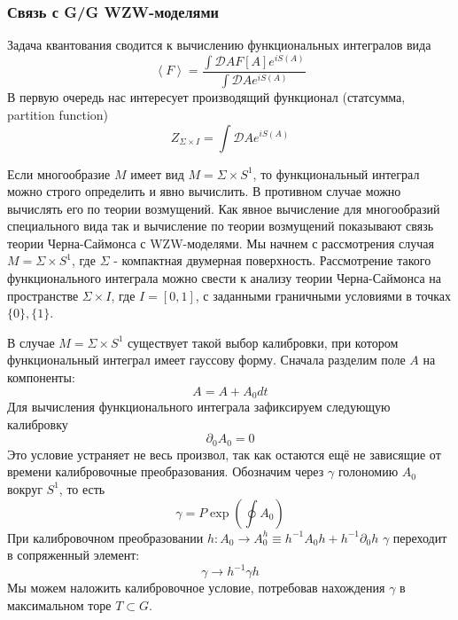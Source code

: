 \documentclass[a4paper,12pt]{article}
\theoremstyle{definition} \newtheorem{Def}{Definition}
\begin{document}
\subsubsection{Связь с G/G WZW-моделями}
\label{sec:gg-wzw}

Задача квантования сводится к вычислению функциональных интегралов вида
\begin{equation}
  \label{eq:9}
  \left< F \right> = \frac{\int \mathcal{D} A F[A] e^{i S(A)}}{\int \mathcal{D} A e^{iS(A)}}
\end{equation}
В первую очередь нас интересует производящий функционал (статсумма, partition function)
\begin{equation}
  \label{eq:14}
  Z_{\Sigma\times I}=\int \mathcal{D} A e^{iS(A)}
\end{equation}

Если многообразие $M$ имеет вид $M=\Sigma\times S^1$, то функциональный интеграл можно строго определить и явно вычислить. В противном случае можно вычислять его по теории возмущений. Как явное вычисление для многообразий специального вида так и вычисление по теории возмущений показывают связь теории Черна-Саймонса с WZW-моделями. Мы начнем с рассмотрения случая $M=\Sigma\times S^1$, где $\Sigma$ - компактная двумерная поверхность. Рассмотрение такого функционального интеграла можно свести к анализу теории Черна-Саймонса на пространстве $\Sigma\times I$, где $I=[0,1]$, с заданными граничными условиями в точках $\{0\}, \{1\}$.

В случае $M=\Sigma\times S^1$ существует такой выбор калибровки, при котором функциональный интеграл имеет гауссову форму.
Сначала разделим поле $A$ на компоненты:
\begin{equation}
  \label{eq:105}
  A=A+A_0 dt
\end{equation}
Для вычисления функционального интеграла зафиксируем следующую калибровку
\begin{equation}
  \label{eq:11}
  \partial_0 A_0 =0
\end{equation}
Это условие устраняет не весь произвол, так как остаются ещё не зависящие от времени калибровочные преобразования. Обозначим через $\gamma$ голономию $A_0$ вокруг $S^1$, то есть
\begin{equation}
  \label{eq:12}
  \gamma=P \exp\left(\oint A_0\right)
\end{equation}
При калибровочном преобразовании $h: A_0\to A_0^h\equiv h^{-1} A_0 h+h^{-1}\partial_0 h$ $\gamma$ переходит в сопряженный элемент:
\begin{equation}
  \label{eq:99}
  \gamma\to h^{-1} \gamma h
\end{equation}
Мы можем наложить калибровочное условие, потребовав нахождения $\gamma$ в максимальном торе $T\subset G$.
\end{document}
